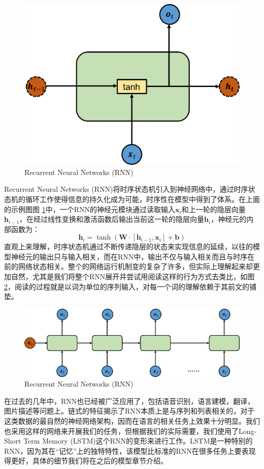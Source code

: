 \documentclass[10pt, titlepage]{article}
\begin{document}
			\begin{figure}[htb]
			\centering
			\includegraphics[width=0.6\columnwidth]{figs/RNN.png}
			\caption{Recurrent Neural Networks (RNN)}
			\label{fig:RNN}
			\end{figure}

Recurrent Neural Networks (RNN)将时序状态机引入到神经网络中，通过时序状态机的循环工作使得信息的持久化成为可能，时序性在模型中得到了体系。在上面的示例图图 \ref{fig:RNN}中，一个RNN的神经元模块通过读取输入$\textbf{x}_i$和上一轮的隐层向量$\textbf{h}_{i-1}$，在经过线性变换和激活函数后输出当前这一轮的隐层向量$\textbf{h}_i$，神经元的内部函数为：
$$\textbf{h}_i = \tanh(\textbf{W}\cdot[\textbf{h}_{i-1},\textbf{x}_i] + \textbf{b})$$
直观上来理解，时序状态机通过不断传递隐层的状态来实现信息的延续，以往的模型神经元的输出只与输入相关，而在RNN中，输出不仅与输入相关而且与时序在前的网络状态相关。整个的网络运行机制变的复杂了许多，但实际上理解起来却更加自然，尤其是我们将整个RNN展开并尝试用阅读这样的行为方式去类比，如图 \ref{fig:RNN1}，阅读的过程就是以词为单位的序列输入，对每一个词的理解依赖于其前文的铺垫。


			\begin{figure}[htb]
			\centering
			\includegraphics[width=0.8\columnwidth]{figs/RNN1.png}
			\caption{Recurrent Neural Networks (RNN)}
			\label{fig:RNN1}
			\end{figure}


在过去的几年中，RNN也已经被广泛应用了，包括语音识别，语言建模，翻译，图片描述等问题上。链式的特征揭示了RNN本质上是与序列和列表相关的，对于这类数据的最自然的神经网络架构，因而在语言的相关任务上效果十分明显。我们也采用这样的网络来开展我们的任务，但根据我们的实际需要，我们使用了Long-Short Term Memory (LSTM)这个RNN的变形来进行工作。LSTM是一种特别的RNN，因为其在“记忆”上的独特特性，该模型比标准的RNN在很多任务上要表现得更好，具体的细节我们将在之后的模型章节介绍。
\end{document}
